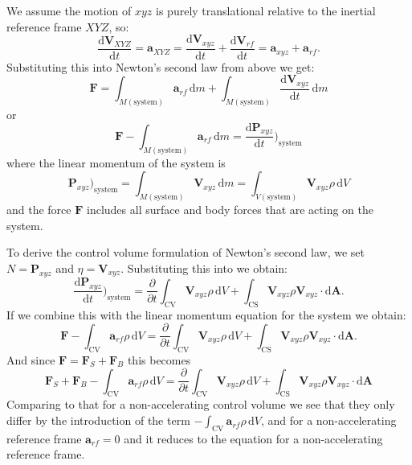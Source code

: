 We assume the motion of $xyz$ is purely translational relative to the inertial reference frame $XYZ$, so:
\[ 
\frac{\mathrm{d}\textbf{V}_{XYZ}}{\mathrm{d}t} = \textbf{a}_{XYZ} = \frac{\mathrm{d}\textbf{V}_{xyz}}{\mathrm{d}t} + \frac{\mathrm{d}\textbf{V}_{rf}}{\mathrm{d}t} = \textbf{a}_{xyz} + \textbf{a}_{rf}
.\]
Substituting this into Newton's second law from above we get:
\[ 
\textbf{F} = \int_{M \left( \mathrm{system} \right)} \textbf{a}_{rf} \, \mathrm{d}m + \int_{M (\mathrm{system})} \frac{\mathrm{d}\textbf{V}_{xyz}}{\mathrm{d}t} \, \mathrm{d}m
\]
or
\[ 
\textbf{F} - \int_{M(\mathrm{system})} \textbf{a}_{rf} \, \mathrm{d}m = \frac{\mathrm{d}\textbf{P}_{xyz}}{\mathrm{d}t} \bigg)_{\mathrm{system}}
\]
where the linear momentum of the system is
\[ 
\textbf{P}_{xyz} )_{\mathrm{system}} = \int_{M (\mathrm{system})} \textbf{V}_{xyz} \, \mathrm{d}m = \int_{V (\mathrm{system})} \textbf{V}_{xyz} \rho \, \mathrm{d}V
\]
and the force $\textbf{F}$ includes all surface and body forces that are acting on the system.

To derive the control volume formulation of Newton's second law, we set $N = \textbf{P}_{xyz}$ and $\eta = \textbf{V}_{xyz}$. Substituting this into  we obtain:
\[ 
\frac{\mathrm{d}\textbf{P}_{xyz}}{\mathrm{d}t} \bigg)_{\mathrm{system}} = \frac{\partial }{\partial t} \int_{\mathrm{CV}} \textbf{V}_{xyz} \rho \, \mathrm{d}V + \int_{\mathrm{CS}} \textbf{V}_{xyz} \rho \textbf{V}_{xyz} \cdot \mathrm{d}\textbf{A}
.\]
If we combine this with the linear momentum equation for the system we obtain:
\[ 
\textbf{F} - \int_{\mathrm{CV}} \textbf{a}_{rf} \rho \, \mathrm{d}V = \frac{\partial}{\partial t} \int_{\mathrm{CV}} \textbf{V}_{xyz} \rho \, \mathrm{d}V + \int_{\mathrm{CS}} \textbf{V}_{xyz} \rho \textbf{V}_{xyz} \cdot \mathrm{d}\textbf{A}
.\]
And since $\textbf{F} = \textbf{F}_S + \textbf{F}_B$ this becomes
\begin{equation}\label{eq:convolN2acc}
  \textbf{F}_S + \textbf{F}_B - \int_{\mathrm{CV}} \textbf{a}_{rf} \rho \, \mathrm{d}V = \frac{\partial}{\partial t} \int_{\mathrm{CV}} \textbf{V}_{xyz} \rho \, \mathrm{d}V + \int_{\mathrm{CS}} \textbf{V}_{xyz} \rho \textbf{V}_{xyz} \cdot \mathrm{d}\textbf{A}
\end{equation}
Comparing  to that for a non-accelerating control volume we see that they only differ by the introduction of the term $- \int_{\mathrm{CV}} \textbf{a}_{rf} \rho \, \mathrm{d}V$, and for a non-accelerating reference frame $\textbf{a}_{rf} = 0$ and it reduces to the equation for a non-accelerating reference frame. 


